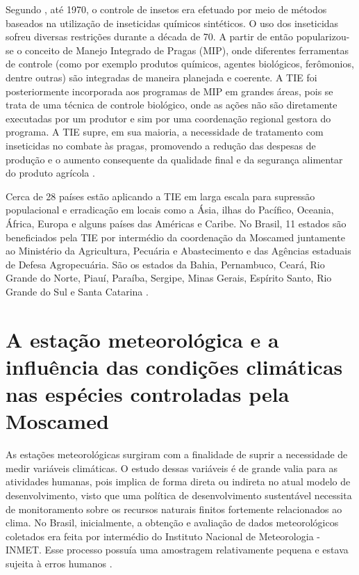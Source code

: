Segundo , até 1970, o controle de insetos era efetuado por meio de métodos baseados na utilização de inseticidas químicos sintéticos. O uso dos inseticidas sofreu diversas restrições durante a década de 70. A partir de então popularizou-se o conceito de Manejo Integrado de Pragas (MIP), onde diferentes ferramentas de controle (como por exemplo produtos químicos, agentes biológicos, ferômonios, dentre outras) são integradas de maneira planejada e coerente. A TIE foi posteriormente incorporada aos programas de MIP em grandes áreas, pois se trata de uma técnica de controle biológico, onde as ações não são diretamente executadas por um produtor e sim por uma coordenação regional gestora do programa. A TIE supre, em sua maioria, a necessidade de tratamento com inseticidas no combate às pragas, promovendo a redução das despesas de produção e o aumento consequente da qualidade final e da segurança alimentar do produto agrícola \cite{MOSCAMED2003CTI}.

Cerca de 28 países estão aplicando a TIE em larga escala para supressão populacional e erradicação em locais como a Ásia, ilhas do Pacífico, Oceania, África, Europa e alguns países das Américas e Caribe. No Brasil, 11 estados são beneficiados pela TIE por intermédio da coordenação da Moscamed juntamente ao Ministério da Agricultura, Pecuária e Abastecimento e das Agências estaduais de Defesa Agropecuária. São os estados da Bahia, Pernambuco, Ceará, Rio Grande do Norte, Piauí, Paraíba, Sergipe, Minas Gerais, Espírito Santo, Rio Grande do Sul e Santa Catarina \cite{MOSCAMEDINST2003, MOSCAMED2003CTI}.


\section{A estação meteorológica e a influência das condições climáticas nas espécies controladas pela Moscamed}

As estações meteorológicas surgiram com a finalidade de suprir a necessidade de medir variáveis climáticas. O estudo dessas variáveis é de grande valia para as atividades humanas, pois implica de forma direta ou indireta no atual modelo de desenvolvimento, visto que uma política de desenvolvimento sustentável necessita de monitoramento sobre os recursos naturais finitos fortemente relacionados ao clima. No Brasil, inicialmente, a obtenção e avaliação de dados meteorológicos coletados era feita por intermédio do Instituto Nacional de Meteorologia - INMET. Esse processo possuía uma amostragem relativamente pequena e estava sujeita à erros humanos \cite{torres2015aquisicao}.
  
